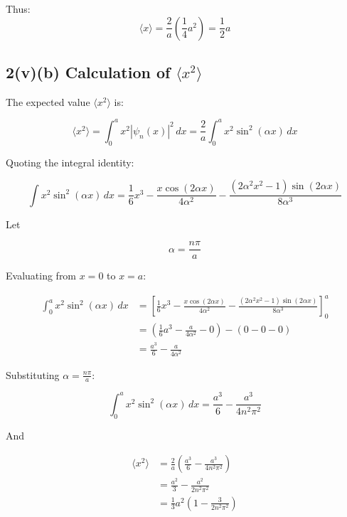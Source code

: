 \documentclass{article}
\begin{document}
Thus:
\begin{equation*}
\boxed{\langle x \rangle = \frac{2}{a} \left( \frac{1}{4}a^2 \right) = \frac{1}{2}a}
\end{equation*}


\subsection*{2(v)(b) Calculation of $\langle x^2 \rangle$}

The expected value $\langle x^2 \rangle$ is:

\begin{equation*}
\langle x^2 \rangle = \int_0^a x^2 |\psi_n(x)|^2 \, dx = \frac{2}{a} \int_0^a x^2 \sin^2(\alpha x) \, dx
\end{equation*}

Quoting the integral identity:

\begin{equation*}
\int x^2 \sin^2(\alpha x) \, dx = \frac{1}{6}x^3 - \frac{x \cos(2\alpha x)}{4\alpha^2} - \frac{(2\alpha^2 x^2 - 1)\sin(2\alpha x)}{8\alpha^3}
\end{equation*}

Let

\begin{equation*}
\alpha = \frac{n\pi}{a}
\end{equation*}

Evaluating from $x = 0$ to $x = a$:

\begin{align*}
\int_0^a x^2 \sin^2(\alpha x) \, dx &= \left[ \frac{1}{6}x^3 - \frac{x \cos(2\alpha x)}{4\alpha^2} - \frac{(2\alpha^2 x^2 - 1)\sin(2\alpha x)}{8\alpha^3} \right]_0^a \\
&= \left( \frac{1}{6}a^3 - \frac{a}{4\alpha^2} - 0 \right) - (0 - 0 - 0) \\
&= \frac{a^3}{6} - \frac{a}{4\alpha^2}
\end{align*}

Substituting $\alpha = \frac{n\pi}{a}$:

\begin{equation*}
\int_0^a x^2 \sin^2(\alpha x) \, dx = \frac{a^3}{6} - \frac{a^3}{4n^2\pi^2}
\end{equation*}

And

\begin{align*}
\langle x^2 \rangle &= \frac{2}{a} \left( \frac{a^3}{6} - \frac{a^3}{4n^2\pi^2} \right) \\
&= \frac{a^2}{3} - \frac{a^2}{2n^2\pi^2} \\
&= \frac{1}{3}a^2 \left( 1 - \frac{3}{2n^2\pi^2} \right)
\end{align*}
\end{document}

